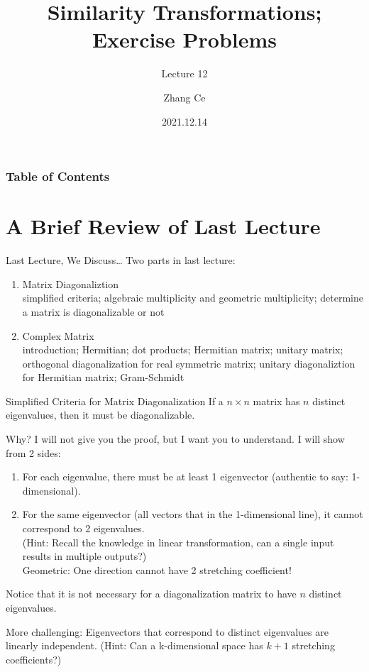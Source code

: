 \documentclass{beamer}
\title[Linear Algebra] %
{Similarity Transformations; Exercise Problems}
\subtitle{Lecture 12}
\author[11910803@mail.sustech.edu.cn] %
{
    Zhang Ce
}
\institute[] %
{
    Department of Electrical and Electronic Engineering\\
    Southern University of Science and Technology
}
\date[2021.12.14] %
{2021.12.14}
\begin{document}
\frame{\titlepage}


\begin{frame}
\frametitle{Table of Contents}
\tableofcontents
\end{frame}
\section{A Brief Review of Last Lecture}
\begin{frame}{Last Lecture, We Discuss\dots}
Two parts in last lecture:
    \begin{enumerate}
        \item Matrix Diagonaliztion\\
        simplified criteria; algebraic multiplicity and geometric multiplicity; determine a matrix is diagonalizable or not
        \item Complex Matrix\\
        introduction; Hermitian; dot products; Hermitian matrix; unitary matrix; orthogonal diagonalization for real symmetric matrix; unitary diagonaliztion for Hermitian matrix; Gram-Schmidt
    \end{enumerate}

\end{frame}

\begin{frame}{Simplified Criteria for Matrix Diagonalization}
If a $n\times n$ matrix has $n$ distinct eigenvalues, then it must be diagonalizable.

\vspace{3pt}
Why? I will not give you the proof, but I want you to understand. I will show from 2 sides:

\begin{enumerate}
    \item For each eigenvalue, there must be at least 1 eigenvector (authentic to say: 1-dimensional).
    \item For the same eigenvector (all vectors that in the 1-dimensional line), it cannot correspond to 2 eigenvalues.\\
    (Hint: Recall the knowledge in linear transformation, can a single input results in multiple outputs?)\\
    Geometric: One direction cannot have 2 stretching coefficient!
\end{enumerate}

Notice that it is not necessary for a diagonalization matrix to have $n$ distinct eigenvalues.

\vspace{3pt}
More challenging: Eigenvectors that correspond to distinct eigenvalues are linearly independent. (Hint: Can a k-dimensional space has $k+1$ stretching coefficients?)

\end{frame}
\end{document}
